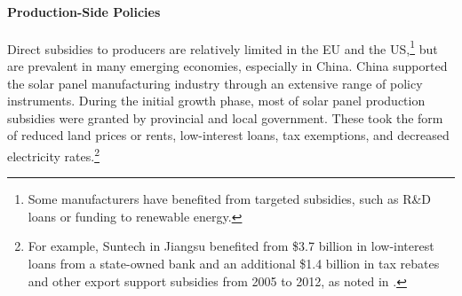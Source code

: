 \documentclass[12pt, letter]{article}
\begin{document}



\paragraph{Production-Side Policies} Direct subsidies to producers are relatively limited in the EU and the US,\footnote{Some manufacturers have benefited from targeted subsidies, such as R\&D loans or funding to renewable energy.} but are prevalent in many emerging economies, especially in China. 
China supported the solar panel manufacturing industry through an extensive range of policy instruments. During the initial growth phase, most of solar panel production subsidies were granted by provincial and local government. These took the form of reduced land prices or rents, low-interest loans, tax exemptions, and decreased electricity rates.\footnote{For example, Suntech in Jiangsu  benefited from \$3.7 billion in low-interest loans from a state-owned bank and an additional \$1.4 billion in tax rebates and other export support subsidies from 2005 to 2012, as noted in \cite{urban2016solar}.}
\end{document}
